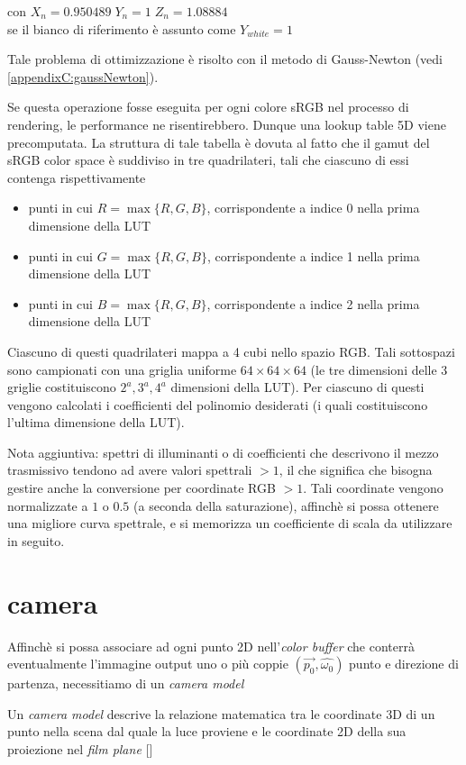 \begin{center}
con $X_n = 0.950489\;Y_n = 1\; Z_n = 1.08884$\\
se il bianco di riferimento \`e assunto come $Y_{white} = 1$\par
\end{center}
Tale problema di ottimizzazione \`e risolto con il metodo di Gauss-Newton (vedi \ref{appendixC:gaussNewton}).\par
Se questa operazione fosse eseguita per ogni colore sRGB nel processo di rendering, le performance ne risentirebbero. Dunque una lookup table 5D viene
precomputata. La struttura di tale tabella \`e dovuta al fatto che il gamut del sRGB color space \`e suddiviso in tre quadrilateri, tali che 
ciascuno di essi contenga rispettivamente 
\begin{itemize}[topsep=0pt, noitemsep]
	\item punti in cui $R = \max\{R, G, B\}$, corrispondente a indice 0 nella prima dimensione della LUT
	\item punti in cui $G = \max\{R, G, B\}$, corrispondente a indice 1 nella prima dimensione della LUT
	\item punti in cui $B = \max\{R, G, B\}$, corrispondente a indice 2 nella prima dimensione della LUT
\end{itemize}
Ciascuno di questi quadrilateri mappa a 4 cubi nello spazio RGB. Tali sottospazi sono campionati con una griglia uniforme 
$64\times 64\times64$ (le tre dimensioni 
delle 3 griglie costituiscono $2^a, 3^a, 4^a$ dimensioni della LUT). Per ciascuno di questi vengono calcolati i coefficienti del polinomio 
desiderati (i quali costituiscono l'ultima dimensione della LUT).\par
Nota aggiuntiva: spettri di illuminanti o di coefficienti che descrivono il mezzo trasmissivo tendono ad avere valori spettrali $>1$, il che significa
che bisogna gestire anche la conversione per coordinate RGB $>1$. Tali coordinate vengono normalizzate a $1$ o $0.5$ (a seconda della saturazione), 
affinch\`e si possa ottenere una migliore curva spettrale, e si memorizza un coefficiente di scala da utilizzare in seguito.
\section{camera}
Affinch\`e si possa associare ad ogni punto 2D nell'\textit{color buffer} che conterr\`a eventualmente l'immagine output uno o pi\`u coppie 
$(\vec{p_0}, \hat{\omega_0})$ punto e direzione di partenza, necessitiamo di un \textit{camera model}
\begin{definitionS}
	Un \textit{camera model} descrive la relazione matematica tra le coordinate 3D di un punto nella scena dal quale la luce proviene e le coordinate 
	2D della sua proiezione nel \textit{film plane}\footnotemark{} [\cite{vision}]
\end{definitionS}
